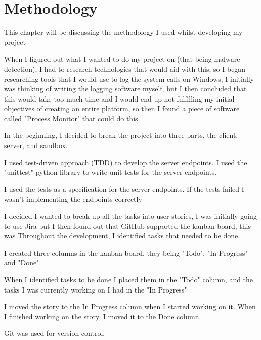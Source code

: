 \chapter{Methodology}

This chapter will be discussing the methodology I used whilst developing my project

When I figured out what I wanted to do my project on (that being malware detection),
I had to research technologies that would aid with this, so I began researching tools that I would use to log the system calls on Windows,
I initially was thinking of writing the logging software myself, but I then concluded that this would take too much time and I would end up not fulfilling my initial objectives of creating an entire platform, so then I found a piece of software called "Process Monitor" that could do this.

In the beginning, I decided to break the project into three parts, the client, server, and sandbox.

I used test-driven approach (TDD) to develop the server endpoints.
I used the "unittest" python library to write unit tests for the server endpoints.

I used the tests as a specification for the server endpoints.
If the tests failed I wasn't implementing the endpoints correctly

I decided I wanted to break up all the tasks into user stories, I was initially going to use Jira but I then found out that GitHub supported the kanban board, this was
Throughout the development, I identified tasks that needed to be done.

I created three columns in the kanban board, they being "Todo", "In Progress" and "Done".

When I identified tasks to be done I placed them in the "Todo" column, and the tasks I was currently working on I had in the "In Progress"

I moved the story to the In Progress column when I started working on it.
When I finished working on the story, I moved it to the Done column.

Git was used for version control.



